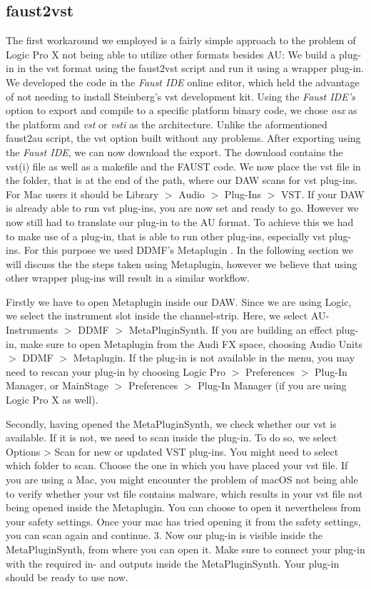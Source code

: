 \documentclass{aes2e}
\begin{document}
\subsection{faust2vst}
The first workaround we employed is a fairly simple approach to the problem of Logic Pro X not being able to utilize other formats besides AU: We build a plug-in in the vst format using the faust2vst script and run it using a wrapper plug-in.
We developed the code in the \textit{Faust IDE} online editor, which held the advantage of not needing to install Steinberg's vst development kit.
Using the \textit{Faust IDE's} option to export and compile to a specific platform binary code, we chose \textit{osx} as the platform and \textit{vst} or \textit{vsti} as the architecture.
Unlike the aformentioned faust2au script, the vst option built without any problems.
After exporting using the \textit{\textit{Faust} IDE}, we can now download the export. The download contains the vst(i) file as well as a makefile and the FAUST code.
We now place the vst file in the folder, that is at the end of the path, where our DAW scans for vst plug-ins. 
For Mac users it should be Library $>$ Audio $>$ Plug-Ins $>$ VST.
If your DAW is already able to run vst plug-ins, you are now set and ready to go. However we now still had to translate our plug-in to the AU format.
To achieve this we had to make use of a plug-in, that is able to run other plug-ins, especially vst plug-ins. For this purpose we used DDMF's Metaplugin \cite{DDMF2021}. 
In the following section we will discuss the the steps taken using Metaplugin, however we believe that using other wrapper plug-ins will result in a similar workflow.

Firstly we have to open Metaplugin inside our DAW.
Since we are using Logic, we select the instrument slot inside the channel-strip. Here, we select AU-Instruments $>$ DDMF $>$ MetaPluginSynth. 
If you are building an effect plug-in, make sure to open Metaplugin from the Audi FX space, choosing Audio Units $>$ DDMF $>$ Metaplugin.
If the plug-in is not available in the menu, you may need to rescan your plug-in by choosing Logic Pro $>$ Preferences $>$ Plug-In Manager, or MainStage $>$ Preferences $>$ Plug-In Manager (if you are using Logic Pro X as well).

Secondly, having opened the MetaPluginSynth, we check whether our vst is available. If it is not, we need to scan inside the plug-in. To do so, we select Options > Scan for new or updated VST plug-ins. You might need to select which folder to scan. Choose the one in which you have placed your vst file.
If you are using a Mac, you might encounter the problem of macOS not being able to verify whether your vst file contains malware, which results in your vst file not being opened inside the Metaplugin. You can choose to open it nevertheless from your safety settings. Once your mac has tried opening it from the safety settings, you can scan again and continue.
3. Now our plug-in is visible inside the MetaPluginSynth, from where you can open it. Make sure to connect your plug-in with the required in- and outputs inside the MetaPluginSynth.
Your plug-in should be ready to use now.
\end{document}
